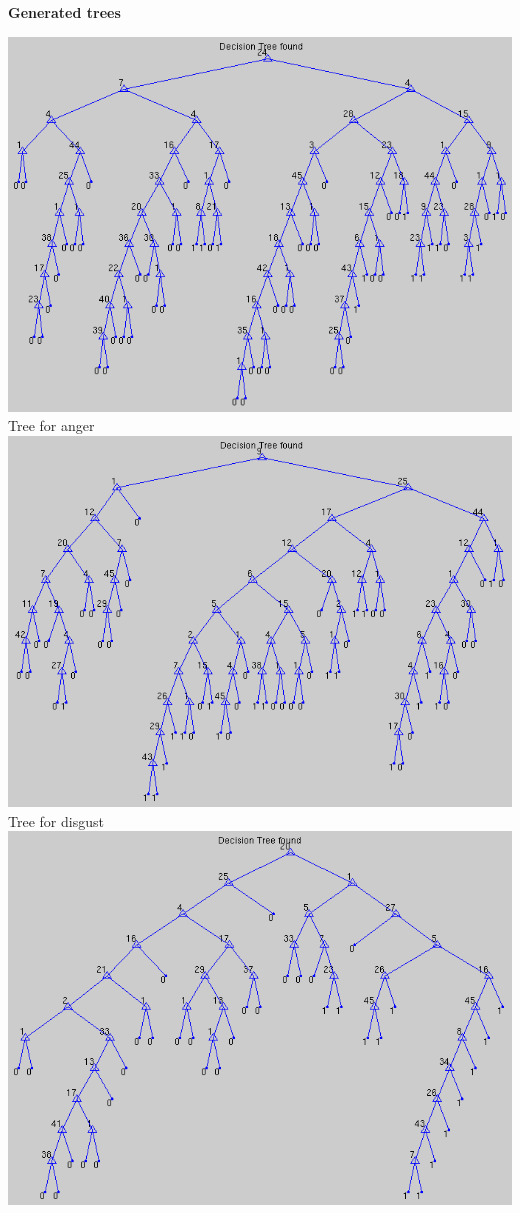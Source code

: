 \documentclass[12pt]{article}
\begin{document}
{\bf Generated trees} \\
\begin{center}
  \includegraphics[scale=0.28]{report-images/tree1.png}
  Tree for anger \\
  \vspace{\baselineskip}
  \includegraphics[scale=0.28]{report-images/tree2.png}
  Tree for disgust \\
  \vspace{\baselineskip}
  \includegraphics[scale=0.28]{report-images/tree3.png}

\end{center}
\end{document}
